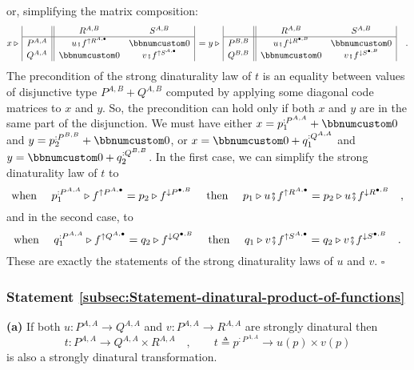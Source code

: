 or, simplifying the matrix composition:
\[
x\triangleright\,\begin{array}{|c||cc|}
 & R^{A,B} & S^{A,B}\\
\hline P^{A,A} & u\bef f^{\uparrow R^{A,\bullet}} & \bbnum 0\\
Q^{A,A} & \bbnum 0 & v\bef f^{\uparrow S^{A,\bullet}}
\end{array}\,=y\triangleright\,\begin{array}{|c||cc|}
 & R^{A,B} & S^{A,B}\\
\hline P^{B,B} & u\bef f^{\downarrow R^{\bullet,B}} & \bbnum 0\\
Q^{B,B} & \bbnum 0 & v\bef f^{\downarrow S^{\bullet,B}}
\end{array}\quad.
\]
The precondition of the strong dinaturality law of $t$ is an equality
between values of disjunctive type $P^{A,B}+Q^{A,B}$ computed by
applying some diagonal code matrices to $x$ and $y$. So, the precondition
can hold only if both $x$ and $y$ are in the same part of the disjunction.
We must have either $x=p_{1}^{:P^{A,A}}+\bbnum 0$ and $y=p_{2}^{:P^{B,B}}+\bbnum 0$,
or $x=\bbnum 0+q_{1}^{:Q^{A,A}}$ and $y=\bbnum 0+q_{2}^{:Q^{B,B}}$.
In the first case, we can simplify the strong dinaturality law of
$t$ to
\[
\text{when }\quad p_{1}^{:P^{A,A}}\triangleright f^{\uparrow P^{A,\bullet}}=p_{2}\triangleright f^{\downarrow P^{\bullet,B}}\quad\text{ then }\quad p_{1}\triangleright u\bef f^{\uparrow R^{A,\bullet}}=p_{2}\triangleright u\bef f^{\downarrow R^{\bullet,B}}\quad,
\]
and in the second case, to 
\[
\text{when }\quad q_{1}^{:P^{A,A}}\triangleright f^{\uparrow Q^{A,\bullet}}=q_{2}\triangleright f^{\downarrow Q^{\bullet,B}}\quad\text{ then }\quad q_{1}\triangleright v\bef f^{\uparrow S^{A,\bullet}}=q_{2}\triangleright v\bef f^{\downarrow S^{\bullet,B}}\quad.
\]
These are exactly the statements of the strong dinaturality laws of
$u$ and $v$. $\square$

\subsubsection{Statement \label{subsec:Statement-dinatural-product-of-functions}\ref{subsec:Statement-dinatural-product-of-functions}}

\textbf{(a)} If both $u:P^{A,A}\rightarrow Q^{A,A}$ and $v:P^{A,A}\rightarrow R^{A,A}$
are strongly dinatural then 
\[
t:P^{A,A}\rightarrow Q^{A,A}\times R^{A,A}\quad,\quad\quad t\triangleq p^{:P^{A,A}}\rightarrow u(p)\times v(p)
\]
is also a strongly dinatural transformation. 

